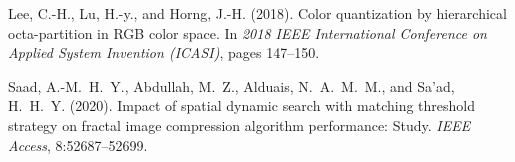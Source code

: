 \documentclass{sbc2023}
\begin{document}



\begin{thebibliography}{99}

Lee, C.-H., Lu, H.-y., and Horng, J.-H. (2018). 
Color quantization by hierarchical octa-partition in RGB color space. 
In \textit{2018 IEEE International Conference on Applied System Invention (ICASI)}, pages 147--150.

Saad, A.-M.~H.~Y., Abdullah, M.~Z., Alduais, N.~A.~M.~M., and Sa'ad, H.~H.~Y. (2020). 
Impact of spatial dynamic search with matching threshold strategy on fractal image compression algorithm performance: Study. 
\textit{IEEE Access}, 8:52687--52699.

\end{thebibliography}
\end{document}
